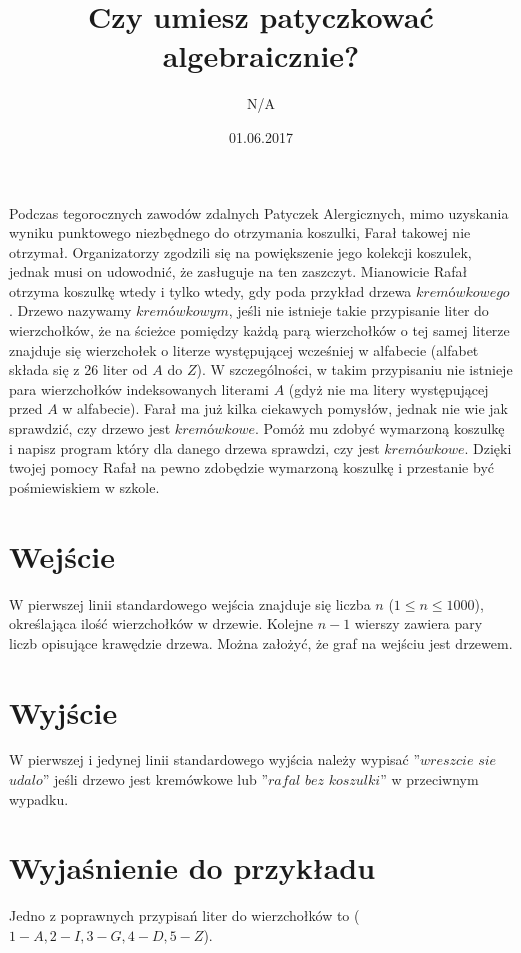 \documentclass[zad,zawodnik,utf8]{sinol}
\title{Czy umiesz patyczkować algebraicznie?}
\author{N/A} %
\date{01.06.2017}
\begin{document}
\begin{tasktext}

Podczas tegorocznych zawodów zdalnych Patyczek Alergicznych, mimo uzyskania wyniku punktowego niezbędnego do otrzymania koszulki, Farał takowej nie otrzymał. Organizatorzy zgodzili się na powiększenie jego kolekcji koszulek, jednak musi on udowodnić, że zasługuje na ten zaszczyt.
 Mianowicie Rafał otrzyma koszulkę wtedy  i tylko wtedy, gdy poda przykład drzewa $kremówkowego$. Drzewo nazywamy $kremówkowym$, jeśli  nie istnieje takie przypisanie liter do wierzchołków, że na ścieżce pomiędzy każdą parą wierzchołków o tej samej literze znajduje się wierzchołek o literze występującej wcześniej w alfabecie (alfabet składa się z 26 liter od $A$ do $Z$).  W szczególności, w takim przypisaniu nie istnieje para wierzchołków indeksowanych literami $A$ (gdyż nie ma litery występującej przed $A$ w alfabecie). Farał ma już kilka ciekawych pomysłów, jednak nie wie jak sprawdzić, czy drzewo jest $kremówkowe$. Pomóż mu zdobyć wymarzoną koszulkę i napisz program który dla danego drzewa sprawdzi, czy jest $kremówkowe$. Dzięki twojej pomocy Rafał na pewno zdobędzie wymarzoną koszulkę i przestanie być pośmiewiskiem w szkole.

  \section{Wejście}
W pierwszej linii standardowego wejścia znajduje się liczba $n$ ($1 \leq n \leq 1000$), określająca ilość wierzchołków w drzewie. Kolejne $n-1$ wierszy zawiera pary liczb opisujące krawędzie drzewa. Można założyć, że graf na wejściu jest drzewem.


	\section{Wyjście}
W pierwszej i jedynej linii standardowego wyjścia należy wypisać ''$wreszcie$ $sie$ $udalo$'' jeśli drzewo jest kremówkowe lub ''$rafal$ $bez$ $koszulki$''  w przeciwnym wypadku.
	\makecompactexample


	\section{Wyjaśnienie do przykładu}
	Jedno z poprawnych przypisań liter do wierzchołków to ($1-A,2-I,3-G,4-D,5-Z$).
\end{tasktext}
\end{document}
